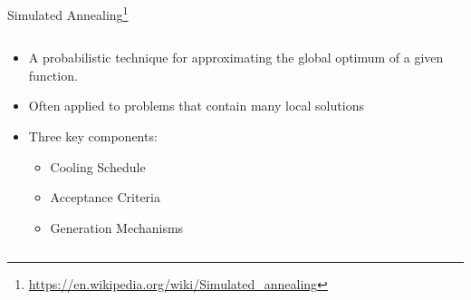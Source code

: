 \documentclass[aspectratio=169,dvipsnames]{beamer}
\begin{document}
\begin{frame}[label={sec:org588fcec}]{Simulated Annealing\footnote{\url{https://en.wikipedia.org/wiki/Simulated\_annealing}}}
\begin{columns}
\begin{column}{0.5\columnwidth}
\begin{itemize}
\item A probabilistic technique for approximating the global optimum of a given function.
\item Often applied to problems that contain many local solutions
\item Three key components:
\begin{itemize}
\item Cooling Schedule
\item Acceptance Criteria
\item Generation Mechanisms
\end{itemize}
\end{itemize}
\end{column}

\begin{column}{0.5\columnwidth}
\centering
{}
\end{column}
\end{columns}
\end{frame}
\end{document}
